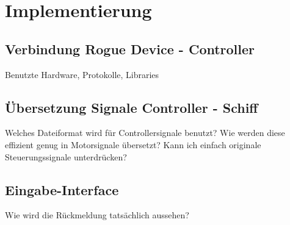 \chapter{Implementierung}

\section{Verbindung Rogue Device - Controller}
Benutzte Hardware, Protokolle, Libraries

\section{Übersetzung Signale Controller - Schiff}
Welches Dateiformat wird für Controllersignale benutzt?
Wie werden diese effizient genug in Motorsignale übersetzt?
Kann ich einfach originale Steuerungssignale unterdrücken?

\section{Eingabe-Interface}
Wie wird die Rückmeldung tatsächlich aussehen?